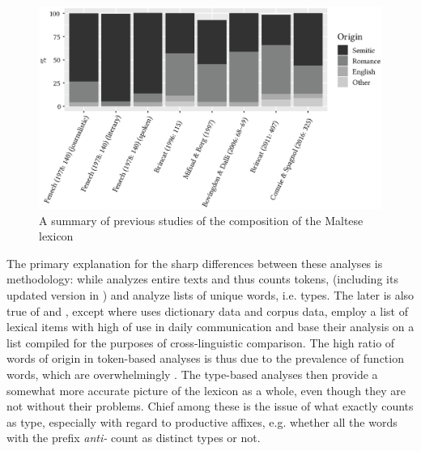 \documentclass[output=paper]{langsci/langscibook}
\begin{document}
\begin{figure}[H]
\centering
\includegraphics[width=12cm]{figures/lexiconnewfont.eps}
\caption{A summary of previous studies of the composition of the Maltese lexicon}
\label{lexiconfig}
\end{figure}

The primary explanation for the sharp differences between these analyses is methodology: while \cite{fenech1978} analyzes entire texts and thus counts tokens, \cite{brincat1996} (including its updated version in \citealt{brincat2011}) and \cite{bovingdondalli2006} analyze lists of unique words, i.e. types. The later is also true of \cite{mifsudborg1997} and \cite{comriespagnol2016}, except where \cite{brincat1996} uses dictionary data and \cite{bovingdondalli2006} corpus data, \cite{mifsudborg1997} employ a list of lexical items with high  of use in daily communication and \cite{comriespagnol2016} base their analysis on a list compiled for the purposes of cross-linguistic comparison. The high ratio of words of  origin in token-based analyses is thus due to the prevalence of function words, which are overwhelmingly . The type-based analyses then provide a somewhat more accurate picture of the lexicon as a whole, even though they are not without their problems. Chief among these is the issue of what exactly counts as type, especially with regard to productive  affixes, e.g. whether all the words with the prefix \textit{anti-} count as distinct types or not.
\end{document}
